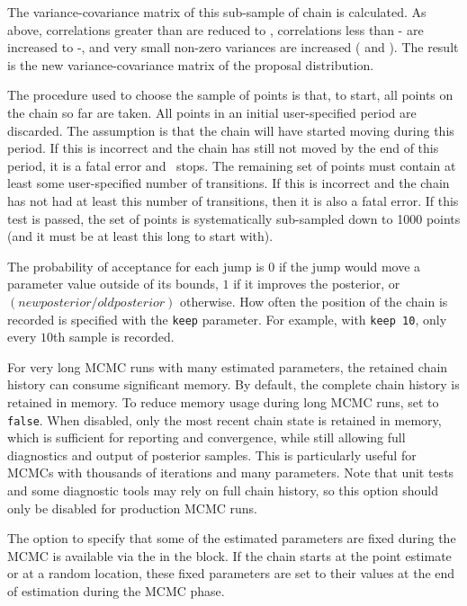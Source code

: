 The variance-covariance matrix of this sub-sample of chain is calculated. As above, correlations greater than  are reduced to , correlations less than - are increased to  -, and very small non-zero variances are increased ( and ). The result is the new variance-covariance matrix of the proposal distribution. 

The procedure used to choose the sample of points is that, to start, all points on the chain so far are taken.  All points in an initial user-specified period are discarded. The assumption is that the chain will have started moving during this period. If this is incorrect and the chain has still not moved by the end of this period, it is a fatal error and \CNAME\ stops. The remaining set of points must contain at least some user-specified number of transitions. If this is incorrect and the chain has not had at least this number of transitions, then it is also a fatal error. If this test is passed, the set of points is systematically sub-sampled down to 1000 points (and it must be at least this long to start with).

The probability of acceptance for each jump is $0$ if the jump would move a parameter value outside of its bounds, $1$ if it improves the posterior, or $(new posterior/old posterior)$ otherwise. How often the position of the chain is recorded is specified with the \texttt{keep} parameter. For example, with \texttt{keep 10}, only every $10$th sample is recorded.

For very long MCMC runs with many estimated parameters, the retained chain history can consume significant memory. By default, the complete chain history is retained in memory. To reduce memory usage during long MCMC runs, set  to \texttt{false}. When disabled, only the most recent chain state is retained in memory, which is sufficient for reporting and convergence, while still allowing full diagnostics and output of posterior samples. This is particularly useful for MCMCs with thousands of iterations and many parameters. Note that unit tests and some diagnostic tools may rely on full chain history, so this option should only be disabled for production MCMC runs.

The option to specify that some of the estimated parameters are fixed during the MCMC is available via the  in the  block. If the chain starts at the point estimate or at a random location, these fixed parameters are set to their values at the end of estimation during the MCMC phase.

